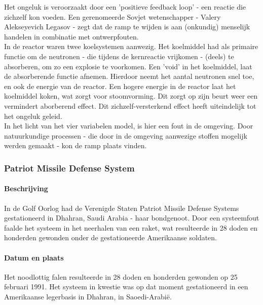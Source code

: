 \documentclass{article}
\begin{document}
				Het ongeluk is veroorzaakt door een 'positieve feedback loop' - een reactie die zichzelf kon voeden. Een gerenomeerde Sovjet wetenschapper - Valery Alekseyevich Legasov - zegt dat de ramp te wijden is aan (onkundig) menselijk handelen in combinatie met ontwerpfouten. \\
				In de reactor waren twee koelsystemen aanwezig. Het koelmiddel had als primaire functie om de neutronen - die tijdens de kernreactie vrijkomen - (deels) te absorberen, om zo een explosie te voorkomen. Een 'void' in het koelmiddel, laat de absorberende functie afnemen. Hierdoor neemt het aantal neutronen snel toe, en ook de energie van de reactor. Een hogere energie in de reactor laat het koelmiddel koken, wat zorgt voor stoomvorming. Dit zorgt op zijn beurt weer een vermindert aborberend effect. Dit zichzelf-versterkend effect heeft uiteindelijk tot het ongeluk geleid. \\
				In het licht van het vier variabelen model, is hier een fout in de omgeving. Door natuurkundige processen - die door in de omgeving aanwezige stoffen mogelijk werden gemaakt - kon de ramp plaats vinden. \par
			
			\subsubsection{Patriot Missile Defense System}

				\paragraph{Beschrijving}

					In de Golf Oorlog had de Verenigde Staten Patriot Missile Defense Systems gestationeerd in Dhahran, Saudi Arabia - haar bondgenoot. Door een systeemfout faalde het systeem in het neerhalen van een raket, wat resulteerde in 28 doden en honderden gewonden onder de gestationeerde Amerikaanse soldaten. \par

				\paragraph{Datum en plaats}

					Het noodlottig falen resulteerde in 28 doden en honderden gewonden op 25 februari 1991. Het systeem in kwestie was op dat moment gestationeerd in een Amerikaanse legerbasis in Dhahran, in Saoedi-Arabië. \cite{general1992patriot} \par
\end{document}
